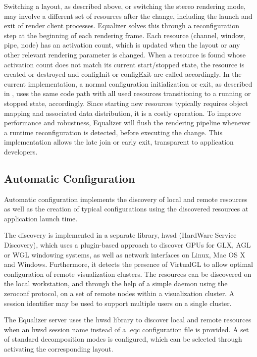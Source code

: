 \documentclass[10pt,journal,compsoc]{IEEEtran}
\begin{document}
Switching a layout, as described above, or switching the stereo rendering mode,
may involve a different set of resources after the change, including the launch
and exit of render client processes. Equalizer solves this through a
reconfiguration step at the beginning of each rendering frame. Each resource
(channel, window, pipe, node) has an activation count, which is updated when the
layout or any other relevant rendering parameter is changed. When a resource is
found whose activation count does not match its current start/stopped state, the
resource is created or destroyed and \textsf{configInit} or \textsf{configExit}
are called accordingly. In the current implementation, a normal configuration
initialization or exit, as described in \cite{EMP:09}, uses the same code path
with all used resources transitioning to a running or stopped state,
accordingly. Since starting new resources typically requires object mapping and
associated data distribution, it is a costly operation. To improve performance
and robustness, Equalizer will flush the rendering pipeline whenever a runtime
reconfiguration is detected, before executing the change. This implementation
allows the late join or early exit, transparent to application developers.


\subsection{Automatic Configuration}

Automatic configuration implements the discovery of local and remote resources
as well as the creation of typical configurations using the discovered resources
at application launch time.

The discovery is implemented in a separate library, hwsd (HardWare Service
Discovery), which uses a plugin-based approach to discover GPUs for GLX, AGL or
WGL windowing systems, as well as network interfaces on Linux, Mac OS X and
Windows. Furthermore, it detects the presence of VirtualGL to allow optimal
configuration of remote visualization clusters. The resources can be discovered
on the local workstation, and through the help of a simple daemon using the
zeroconf protocol, on a set of remote nodes within a visualization cluster. A
session identifier may be used to support multiple users on a single cluster.

The Equalizer server uses the hwsd library to discover local and remote
resources when an hwsd session name instead of a \textsf{.eqc} configuration
file is provided. A set of standard decomposition modes is configured, which can
be selected through activating the corresponding layout.
\end{document}
